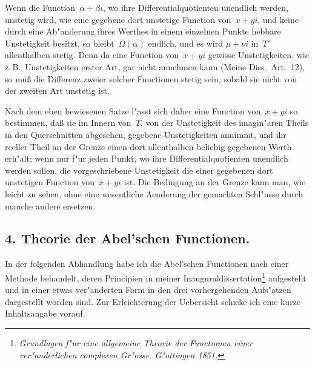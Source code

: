 \documentclass[12pt,a4paper]{article}
\begin{document}
Wenn die Function~$\alpha + \beta i$, wo ihre Differentialquotienten unendlich
werden, unstetig wird, wie eine gegebene dort unstetige Function von~$x + yi$,
und keine durch eine Ab"anderung ihres Werthes in einem einzelnen Punkte
hebbare Unstetigkeit besitzt, so bleibt~$\Omega(\alpha)$ endlich, und es wird
$\mu + \nu i$ in~$T'$ allenthalben stetig. Denn da eine Function von~$x + yi$
gewisse Unstetigkeiten, wie z.\,B.\ Unstetigkeiten erster Art, gar nicht
annehmen kann (Meine Diss.\ Art.~12), so mu\ss{} die Differenz zweier solcher
Functionen stetig sein, sobald sie nicht von der zweiten Art unstetig ist.

Nach dem eben bewiesenen Satze l"asst sich daher eine Function von~$x + yi$
so bestimmen, da\ss{} sie im Innern von~$T$, von der Unstetigkeit des
imagin"aren Theils in den Querschnitten abgesehen, gegebene Unstetigkeiten
annimmt, und ihr reeller Theil an der Grenze einen dort allenthalben
beliebig gegebenen Werth erh"alt; wenn nur f"ur jeden Punkt, wo ihre
Differentialquotienten unendlich werden sollen, die vorgeschriebene
Unstetigkeit die einer gegebenen dort unstetigen Function von~$x + yi$ ist.
Die Bedingung an der Grenze kann man, wie leicht zu sehen, ohne eine
wesentliche Aenderung der gemachten Schl"usse durch manche andere ersetzen.

\newpage
\subsection*{4. Theorie der Abel'schen Functionen.}

In der folgenden Abhandlung habe ich die Abel'schen Functionen nach
einer Methode behandelt, deren Principien in meiner Inauguraldissertation\footnote{\textit{Grundlagen f"ur eine allgemeine Theorie der Functionen einer
ver"anderlichen complexen Gr"osse. G"ottingen 1851.}} aufgestellt und in einer
etwas ver"anderten Form in den drei vorhergehenden Aufs"atzen dargestellt
worden sind. Zur Erleichterung der Uebersicht schicke ich eine kurze
Inhaltsangabe vorauf.
\end{document}
